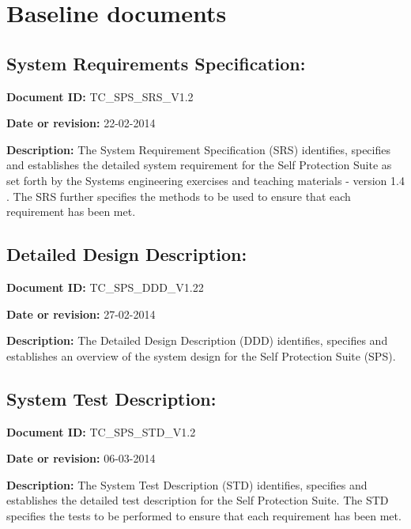 \documentclass[Main]{subfiles}
\begin{document}
\chapter{Baseline documents}
\section{System Requirements Specification:}

\textbf{Document ID:}
TC\_SPS\_SRS\_V1.2

\textbf{Date or revision:}
22-02-2014

\textbf{Description:}
The System Requirement Specification (SRS) identifies, specifies and establishes the detailed system requirement for the Self Protection Suite as set forth by the Systems engineering exercises and teaching materials - version 1.4 \cite{SE-book}.
The SRS further specifies the methods to be used to ensure that each requirement has been met. 

\section{Detailed Design Description:}
\textbf{Document ID:} 
TC\_SPS\_DDD\_V1.22

\textbf{Date or revision:}
27-02-2014

\textbf{Description:}
The Detailed Design Description (DDD) identifies, specifies and establishes an overview of the system design for the Self Protection Suite (SPS).

\section{System Test Description:}
\textbf{Document ID: }
TC\_SPS\_STD\_V1.2

\textbf{Date or revision:}
06-03-2014

\textbf{Description:}
The System Test Description (STD) identifies, specifies and establishes the detailed test description for the Self Protection Suite.
The STD specifies the tests to be performed to ensure that each requirement has been met. 
\end{document}
